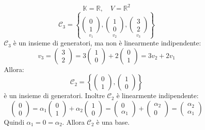 \documentclass[a4paper]{article}
\theoremstyle{break}
\theoremstyle{break}
\theoremstyle{break}
\theoremstyle{break}
\begin{document}
\begin{figure}[H]
  \begin{example}
    \[
    \mathbb{K} = \mathbb{R}, \quad V = \mathbb{R}^2
    \] 
    \[
      \mathcal{C}_3 = \left\{ \underset{v_1}{\begin{pmatrix} 
          0\\1
      \end{pmatrix}},
      \underset{v_2}{\begin{pmatrix} 
        1\\0
      \end{pmatrix}} ,
      \underset{v_3}{\begin{pmatrix} 
        3\\2
  \end{pmatrix}} \right\} 
    \] 
    \( \mathcal{C}_3 \) è un insieme di generatori, ma non è linearmente indipendente:
    \[
    v_3 = \begin{pmatrix} 
      3\\2
    \end{pmatrix} 
    =
    3 \begin{pmatrix} 1\\0 \end{pmatrix} 
    +
    2 \begin{pmatrix} 0\\1 \end{pmatrix} 
    = 3 v_2 + 2 v_1
    \] 
    Allora:
    \[
      \mathcal{C}_2 = \left\{ \begin{pmatrix} 
          0\\1
        \end{pmatrix},
        \begin{pmatrix} 
          1\\0
        \end{pmatrix}
      \right\}
    \] 
    è un insieme di generatori. Inoltre \( \mathcal{C}_2 \) è linearmente indipendente:
    \[
    \begin{pmatrix} 0\\0 \end{pmatrix} 
    =
    \alpha_1 \begin{pmatrix} 0\\1 \end{pmatrix} 
    +
    \alpha_2 \begin{pmatrix} 1\\0 \end{pmatrix} 
    =
    \begin{pmatrix} 0\\\alpha_1 \end{pmatrix} 
    +
    \begin{pmatrix} \alpha_2\\0 \end{pmatrix} 
    =
    \begin{pmatrix} \alpha_2\\\alpha_1\end{pmatrix} 
    \] 
    Quindi \( \alpha_1 = 0 = \alpha_2 \). Allora \( \mathcal{C}_2 \) è una base.
  \end{example}
\end{figure}
\end{document}
